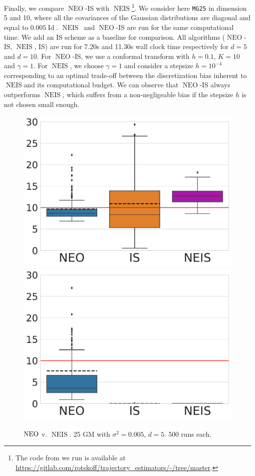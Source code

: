 \documentclass{article}
\def\IFIS{\ensuremath{\operatorname{NEO}}}
\def\NEO{{\small \IFIS}}
\def\Id{\operatorname{Id}}
\newcommand{\1}{\mathds{1}}
\def\Id{\operatorname{Id}}
\def\Id{\operatorname{Id}}
\def\NEIS{\ensuremath{\operatorname{NEIS}}}
\begin{document}
Finally, we compare \NEO-IS with \NEIS\footnote{The code from
  \cite{rotskoff:vanden-eijden:2019} we run is available at
  \url{https://gitlab.com/rotskoff/trajectory_estimators/-/tree/master}.}. We
consider here \texttt{MG25} in dimension 5 and 10, where all the
covariances of the Gaussian distributions are diagonal and equal to
$0.005\Id$. \NEIS\ and \NEO-IS are run for the same computational
time. We add an IS scheme as a baseline for comparison. All algorithms (\NEO-IS, \NEIS, IS) are run for  7.20s and 11.30s wall clock time respectively for $d = 5$ and $d = 10$. For \NEO-IS,
we use a conformal transform with $h=0.1$, $K=10$ and $\gamma =
1$. For \NEIS, we choose $\gamma=1$ and consider a stepsize
$h= 10^{-4}$ corresponding to an optimal trade-off between the
discretization bias inherent to \NEIS and its computational budget. We
can observe that \NEO-IS always outperforms \NEIS, which suffers from a non-negligeable bias if the stepsize $h$ is not chosen small enough. 
\begin{figure}[!ht]
    \centering
    \includegraphics[width=0.4 \linewidth]{NEOvNEIS_25gauss_dim5_0005-5.pdf}
    \includegraphics[width=0.4 \linewidth]{NEOvNEIS_25gauss_dim10_0005.pdf}
    \caption{$\NEO$ v. $\NEIS$. 25 GM with $\sigma^2 = 0.005$, $ d = 5$. 
     500 runs each.}
    \label{fig:simple_gauss_neis}
\end{figure}
\end{document}

